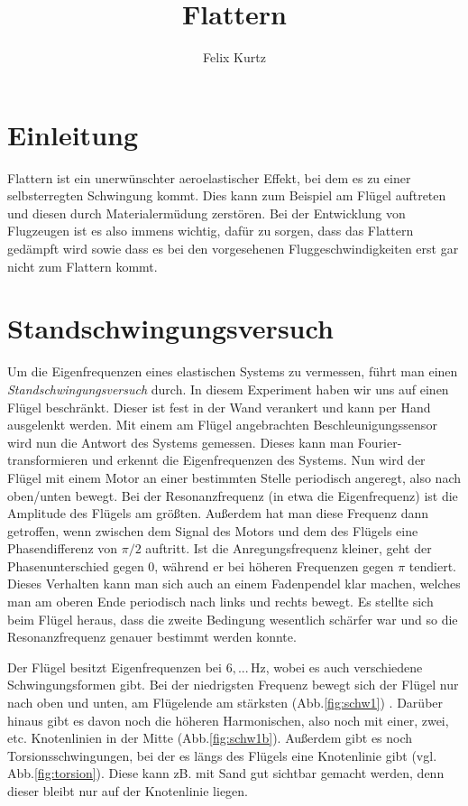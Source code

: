 \documentclass[12pt,a4paper,headinclude,bibtotoc]{scrartcl}
\begin{document}
\title{Flattern}
\author{Felix Kurtz}
\maketitle

\section{Einleitung}
Flattern ist ein unerwünschter aeroelastischer Effekt, bei dem es zu einer selbsterregten Schwingung kommt.
Dies kann zum Beispiel am Flügel auftreten und diesen durch Materialermüdung zerstören.
Bei der Entwicklung von Flugzeugen ist es also immens wichtig, dafür zu sorgen, dass das Flattern gedämpft wird sowie dass es bei den vorgesehenen Fluggeschwindigkeiten erst gar nicht zum Flattern kommt.

\section{Standschwingungsversuch}
Um die Eigenfrequenzen eines elastischen Systems zu vermessen, führt man einen \textit{Standschwingungsversuch} durch.
In diesem Experiment haben wir uns auf einen Flügel beschränkt.
Dieser ist fest in der Wand verankert und kann per Hand ausgelenkt werden.
Mit einem am Flügel angebrachten Beschleunigungssensor wird nun die Antwort des Systems gemessen.
Dieses kann man Fourier-transformieren und erkennt die Eigenfrequenzen des Systems.
Nun wird der Flügel mit einem Motor an einer bestimmten Stelle periodisch angeregt, also nach oben/unten bewegt.
Bei der Resonanzfrequenz (in etwa die Eigenfrequenz) ist die Amplitude des Flügels am größten.
Außerdem hat man diese Frequenz dann getroffen, wenn zwischen dem Signal des Motors und dem des Flügels eine Phasendifferenz von $\pi/2$ auftritt.
Ist die Anregungsfrequenz kleiner, geht der Phasenunterschied gegen $0$, während er bei höheren Frequenzen gegen $\pi$ tendiert.
Dieses Verhalten kann man sich auch an einem Fadenpendel klar machen, welches man am oberen Ende periodisch nach links und rechts bewegt.
Es stellte sich beim Flügel heraus, dass die zweite Bedingung wesentlich schärfer war und so die Resonanzfrequenz genauer bestimmt werden konnte.

Der Flügel besitzt Eigenfrequenzen bei $6,...\,$Hz, wobei es auch verschiedene Schwingungsformen gibt.
Bei der niedrigsten Frequenz  bewegt sich der Flügel nur nach oben und unten, am Flügelende am stärksten (Abb.\ref{fig:schw1}) .
Darüber hinaus gibt es davon noch die höheren Harmonischen, also noch mit einer, zwei, etc. Knotenlinien in der Mitte (Abb.\ref{fig:schw1b}).
Außerdem gibt es noch Torsionsschwingungen, bei der es längs des Flügels eine Knotenlinie gibt (vgl. Abb.\ref{fig:torsion}).
Diese kann zB. mit Sand gut sichtbar gemacht werden, denn dieser bleibt nur auf der Knotenlinie liegen.
\end{document}
